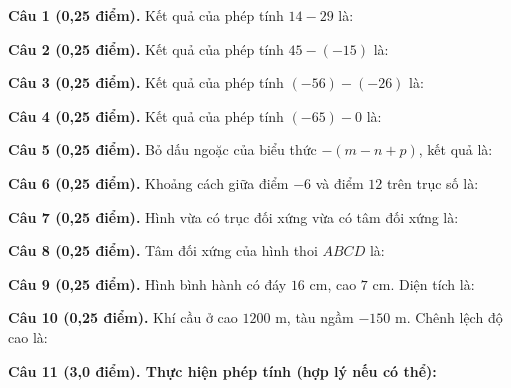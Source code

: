 \documentclass[12pt,a4paper]{article}
\begin{document}
\vspace{1.0mm}
\noindent\textbf{Câu 1 (0,25 điểm).} Kết quả của phép tính $14 - 29$ là: \par\vspace{0.25mm}
\noindent\textbf{Câu 2 (0,25 điểm).} Kết quả của phép tính $45 - (-15)$ là: \par\vspace{0.25mm}
\noindent\textbf{Câu 3 (0,25 điểm).} Kết quả của phép tính $(-56) - (-26)$ là: \par\vspace{0.25mm}
\noindent\textbf{Câu 4 (0,25 điểm).} Kết quả của phép tính $(-65) - 0$ là: \par\vspace{0.25mm}
\noindent\textbf{Câu 5 (0,25 điểm).} Bỏ dấu ngoặc của biểu thức $-(m - n + p)$, kết quả là: \par\vspace{0.25mm}
\noindent\textbf{Câu 6 (0,25 điểm).} Khoảng cách giữa điểm $-6$ và điểm $12$ trên trục số là: \par\vspace{0.25mm}
\noindent\textbf{Câu 7 (0,25 điểm).} Hình vừa có trục đối xứng vừa có tâm đối xứng là: \par\vspace{0.25mm}
\noindent\textbf{Câu 8 (0,25 điểm).} Tâm đối xứng của hình thoi $ABCD$ là: \par\vspace{0.25mm}
\noindent\textbf{Câu 9 (0,25 điểm).} Hình bình hành có đáy $16\text{ cm}$, cao $7\text{ cm}$. Diện tích là: \par\vspace{0.25mm}
\noindent\textbf{Câu 10 (0,25 điểm).} Khí cầu ở cao $1200\text{ m}$, tàu ngầm $-150\text{ m}$. Chênh lệch độ cao là: \par\vspace{0.25mm}

\vspace{0.3mm}
\noindent\textbf{Câu 11 (3,0 điểm). Thực hiện phép tính (hợp lý nếu có thể):}
\vspace{0.4mm}
\end{document}
